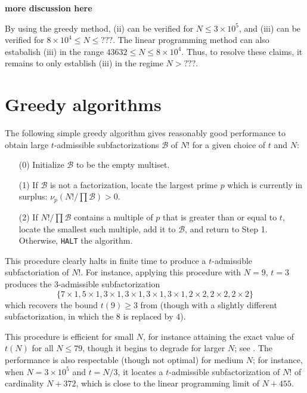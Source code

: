 \documentclass[12pt,a4paper,reqno]{amsart}
\numberwithin{equation}{section}
\theoremstyle{plain}
\theoremstyle{definition}
\newcommand\tuple{{\mathcal B}}
\begin{document}
{\bf more discussion here}

By using the greedy method, (ii) can be verified for $N \leq 3 \times 10^5$, and (iii) can be verified for $8 \times 10^4 \leq N \leq ???$.  The linear programming method can also estabalish (iii) in the range $43632 \leq N \leq 8 \times 10^4$.  Thus, to resolve these claims, it remains to only establish (iii) in the regime $N > ???$.

\section{Greedy algorithms}\label{greedy-sec}

The following simple greedy algorithm gives reasonably good performance to obtain large $t$-admissible subfactorizations $\tuple$ of $N!$ for a given choice of $t$ and $N$:

\begin{enumerate}
\item[(0)] Initialize $\tuple$ to be the empty multiset. 
\item[(1)] If $\tuple$ is not a factorization, locate the largest prime $p$ which is currently in surplus: $\nu_p(N!/\prod \tuple) > 0$. 
\item[(2)] If $N! / \prod \tuple$ contains a multiple of $p$ that is greater than or equal to $t$, locate the smallest such multiple, add it to $\tuple$, and return to Step 1.  Otherwise, \texttt{HALT} the algorithm. 
\end{enumerate}

This procedure clearly halts in finite time to produce a $t$-admissible subfactoriation of $N!$.  For instance, applying this procedure with $N=9$, $t=3$ produces the $3$-admissible subfactorization
$$ \{7 \times 1, 5 \times 1, 3 \times 1, 3 \times 1, 3 \times 1, 3 \times 1, 2 \times 2, 2 \times 2, 2 \times 2 \}$$
which recovers the bound $t(9) \geq 3$ from  (though with a slightly different subfactorization, in which the $8$ is replaced by $4$).

This procedure is efficient for small $N$, for instance attaining the exact value of $t(N)$ for all $N \leq 79$, though it begins to degrade for larger $N$; see .  The performance is also respectable (though not optimal) for medium $N$; for instance, when $N=3 \times 10^5$ and $t=N/3$, it locates a $t$-admissible subfactorization of $N!$ of cardinality $N+372$, which is close to the linear programming limit of $N+455$.
\end{document}
